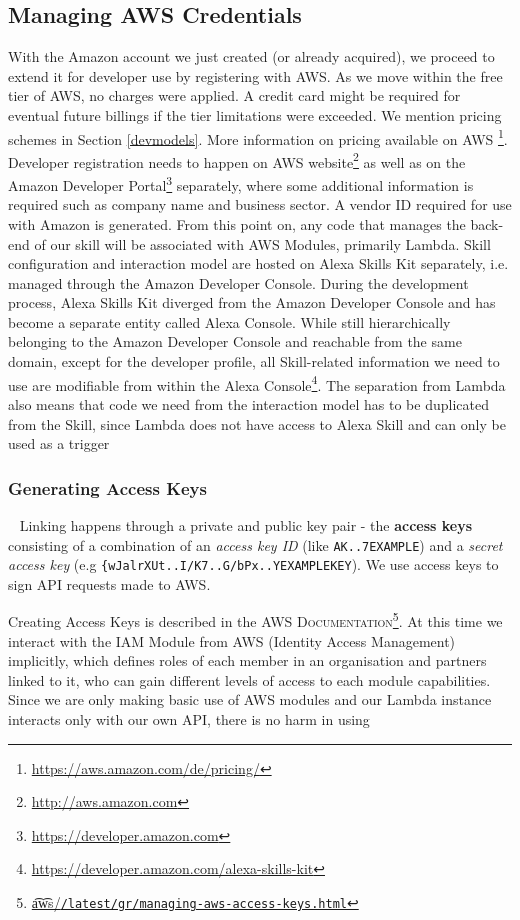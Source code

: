 \subsection*{Managing AWS Credentials}

With the Amazon account we just created (or already acquired), we proceed to extend it for developer use by registering with AWS. %
As we move within the free tier of AWS, no charges were applied. A credit card might be required for eventual future billings if the tier limitations were exceeded. We mention pricing schemes in Section \ref{devmodels}. More information on pricing available on AWS \footnote{\url{https://aws.amazon.com/de/pricing/}}. Developer registration needs to happen on AWS website\footnote{\url{http://aws.amazon.com}} as well as on the Amazon Developer Portal\footnote{\url{https://developer.amazon.com}} separately, where some additional information is required such as company name and business sector. A vendor ID required for use with Amazon is generated. From this point on, any code that manages the back-end of our skill will be associated with AWS Modules, primarily Lambda. Skill configuration and interaction model are hosted on Alexa Skills Kit separately, i.e. managed through the Amazon Developer Console. During the development process, Alexa Skills Kit diverged from the Amazon Developer Console and has become a separate entity called Alexa Console. While still hierarchically belonging to the Amazon Developer Console and reachable from the same domain, except for the developer profile, all Skill-related information we need to use are modifiable from within the Alexa Console\footnote{\url{https://developer.amazon.com/alexa-skills-kit}}. The separation from Lambda also means that code we need from the interaction model has to be duplicated from the Skill, since Lambda does not have access to Alexa Skill and can only be used as a trigger

\subsubsection*{Generating Access Keys}~\label{accesskeys}
Linking happens through a private and public key pair - the \textbf{access keys} consisting of a
combination of an \textit{access key ID} (like \lstinline|AK..7EXAMPLE|) and a \textit{secret access key} (e.g \lstinline|{wJalrXUt..I/K7..G/bPx..YEXAMPLEKEY|). We use access keys to sign API requests made to AWS.

Creating Access Keys is described in the \textsc{AWS Documentation}\footnote{\href{https://docs.aws.amazon.com/general/latest/gr/managing-aws-access-keys.html}{\t{a\t{ws}}/\lstinline|/latest/gr/managing-aws-access-keys.html|}}. At this time we interact with the IAM Module from AWS (Identity Access Management) implicitly, which defines roles of each member in an organisation and partners linked to it, who can gain different levels of access to each module capabilities. Since we are only making basic use of AWS modules and our Lambda instance interacts only with our own API, there is no harm in using 


